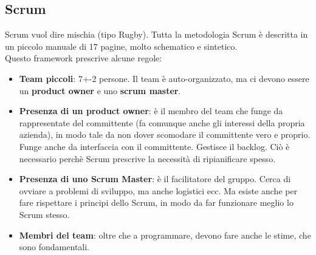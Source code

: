 \documentclass[a4paper,12pt]{article}
\begin{document}
\subsection{Scrum}
Scrum vuol dire mischia (tipo Rugby). Tutta la metodologia Scrum è descritta in un piccolo manuale di 17 pagine, molto schematico e sintetico.\\
Questo framework prescrive alcune regole:
\begin{itemize}
\item \textbf{Team piccoli}: 7+-2 persone. Il team è auto-organizzato, ma ci devono essere un \textbf{product owner} e uno \textbf{scrum master}.
\item \textbf{Presenza di un \textbf{product owner}}: è il membro del team che funge da rappresentate del committente (fa comunque anche gli interessi della propria azienda), in modo tale da non dover scomodare il committente vero e proprio. Funge anche da interfaccia con il committente. Gestisce il backlog. Ciò è necessario perchè Scrum prescrive la necessità di ripianificare spesso.
\item \textbf{Presenza di uno Scrum Master}: è il facilitatore del gruppo. Cerca di ovviare a problemi di sviluppo, ma anche logistici ecc. Ma esiste anche per fare rispettare i principi dello Scrum, in modo da far funzionare meglio lo Scrum stesso.
\item \textbf{Membri del team}: oltre che a programmare, devono fare anche le stime, che sono fondamentali.
\end{itemize}
\end{document}
